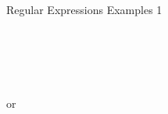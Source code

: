 \documentclass[11pt, a4paper, landscape]{scrartcl}
\newcommand{\regex}[1]{\texttt{#1}}
\begin{document}
\begin{cheatsheet}{Regular Expressions Examples 1}
\begin{col2}
\end{col2}

\begin{col3}


\regex{}\\


\regex{}\\


\regex{}\\
or\\
\regex{}\\

\end{col3}

\end{cheatsheet}

\newpage
\end{document}
